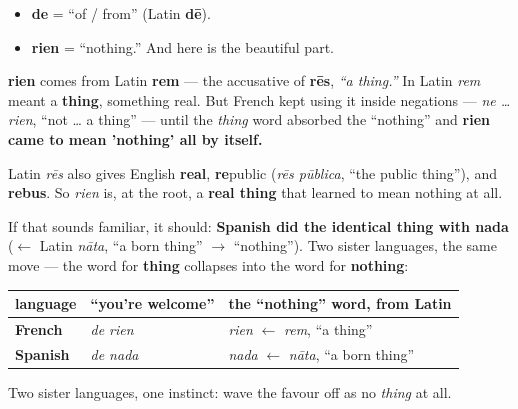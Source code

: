 \begin{cousinweb}
\begin{itemize}
\raggedright
  \item \textbf{de} = \textquotedblleft{}of / from\textquotedblright{} (Latin \textbf{dē}).
  \item \textbf{rien} = \textquotedblleft{}nothing.\textquotedblright{} And here is the beautiful part.
\end{itemize}

\textbf{rien} comes from Latin \textbf{rem} — the accusative of \textbf{rēs}, \emph{\textquotedblleft{}a thing.\textquotedblright{}} In Latin \emph{rem} meant a \textbf{thing}, something real. But French kept using it inside negations — \emph{ne … rien}, \textquotedblleft{}not … a thing\textquotedblright{} — until the \emph{thing} word absorbed the \textquotedblleft{}nothing\textquotedblright{} and \textbf{rien came to mean 'nothing' all by itself.}

Latin \emph{rēs} also gives English \textbf{real}, \textbf{re}public (\emph{rēs pūblica}, \textquotedblleft{}the public thing\textquotedblright{}), and \textbf{rebus}. So \emph{rien} is, at the root, a \textbf{real thing} that learned to mean nothing at all.
\end{cousinweb}

\begin{culture}
If that sounds familiar, it should: \textbf{Spanish did the identical thing with nada} ($\leftarrow$ Latin \emph{nāta}, \textquotedblleft{}a born thing\textquotedblright{} $\to$ \textquotedblleft{}nothing\textquotedblright{}). Two sister languages, the same move — the word for \textbf{thing} collapses into the word for \textbf{nothing}:

\noindent
\begin{tabularx}{\linewidth}{@{}>{\raggedright\arraybackslash}X>{\raggedright\arraybackslash}X>{\raggedright\arraybackslash}X@{}}
\toprule
\textbf{language} & \textbf{\textquotedblleft{}you're welcome\textquotedblright{}} & \textbf{the \textquotedblleft{}nothing\textquotedblright{} word, from Latin} \\
\midrule
\textbf{French} & \emph{de rien} & \emph{rien} $\leftarrow$ \emph{rem}, \textquotedblleft{}a thing\textquotedblright{} \\
\textbf{Spanish} & \emph{de nada} & \emph{nada} $\leftarrow$ \emph{nāta}, \textquotedblleft{}a born thing\textquotedblright{} \\
\bottomrule
\end{tabularx}

Two sister languages, one instinct: wave the favour off as no \emph{thing} at all.
\end{culture}

